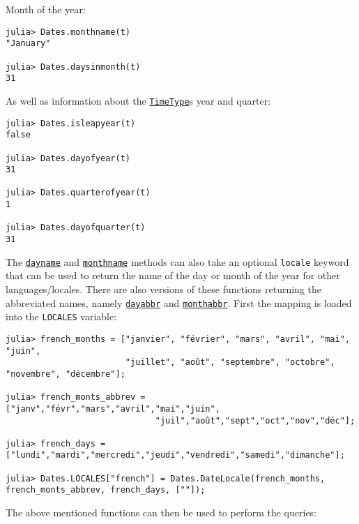 Month of the year:




\begin{verbatim}
julia> Dates.monthname(t)
"January"

julia> Dates.daysinmonth(t)
31
\end{verbatim}



As well as information about the \hyperlink{4438614350756187528}{\texttt{TimeType}}{\textquotesingle}s year and quarter:




\begin{verbatim}
julia> Dates.isleapyear(t)
false

julia> Dates.dayofyear(t)
31

julia> Dates.quarterofyear(t)
1

julia> Dates.dayofquarter(t)
31
\end{verbatim}



The \hyperlink{2440842966718954493}{\texttt{dayname}} and \hyperlink{16585759639636493546}{\texttt{monthname}} methods can also take an optional \texttt{locale} keyword that can be used to return the name of the day or month of the year for other languages/locales. There are also versions of these functions returning the abbreviated names, namely \hyperlink{18198970391837299875}{\texttt{dayabbr}} and \hyperlink{12804940912944832895}{\texttt{monthabbr}}. First the mapping is loaded into the \texttt{LOCALES} variable:




\begin{verbatim}
julia> french_months = ["janvier", "février", "mars", "avril", "mai", "juin",
                        "juillet", "août", "septembre", "octobre", "novembre", "décembre"];

julia> french_monts_abbrev = ["janv","févr","mars","avril","mai","juin",
                              "juil","août","sept","oct","nov","déc"];

julia> french_days = ["lundi","mardi","mercredi","jeudi","vendredi","samedi","dimanche"];

julia> Dates.LOCALES["french"] = Dates.DateLocale(french_months, french_monts_abbrev, french_days, [""]);
\end{verbatim}



The above mentioned functions can then be used to perform the queries:




